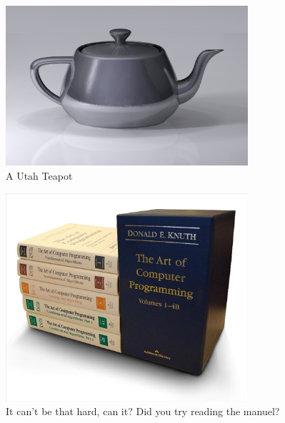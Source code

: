 \documentclass[12pt]{book}
\begin{document}
\begin{figure}
    \centering
    \includegraphics[width=0.8\textwidth]{figures/utah.png}
    \caption{A Utah Teapot \cite{teapot}}
\end{figure}

\begin{figure}
    \centering
    \includegraphics[width=0.8\textwidth]{figures/aocp.jpg}
    \caption{It can't be that hard, can it? Did you try reading the manuel? \cite{eulerarchive}}
\end{figure}
\end{document}
